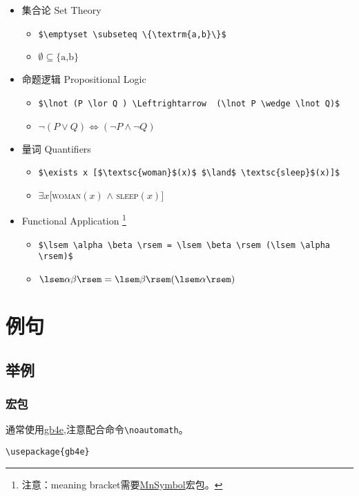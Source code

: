 \documentclass[a4paper,12pt]{article}
\begin{document}
\begin{itemize}
	\item 集合论 Set Theory
	\begin{itemize}
		\item \verb|$\emptyset \subseteq \{\textrm{a,b}\}$|
		\item $\emptyset \subseteq \{\textrm{a,b}\}$
	\end{itemize}
	\item 命题逻辑 Propositional Logic
	\begin{itemize}
		\item \verb|$\lnot (P \lor Q ) \Leftrightarrow	(\lnot P \wedge \lnot Q)$|
		\item $\lnot (P \lor Q ) \Leftrightarrow
		(\lnot P \wedge \lnot Q)$
	\end{itemize}
	\item 量词 Quantifiers
	\begin{itemize}
		\item \verb|$\exists x [$\textsc{woman}$(x)$ $\land$ \textsc{sleep}$(x)]$|
		\item $\exists x [$\textsc{woman}$(x)$ $\land$ \textsc{sleep}$(x)]$
	\end{itemize}
	\item Functional Application \footnote{注意：meaning bracket需要\href{https://www.ctan.org/pkg/mnsymbol}{MnSymbol}宏包。}
	\begin{itemize}
		\item \verb|$\lsem \alpha \beta \rsem = \lsem \beta \rsem (\lsem \alpha \rsem)$|
		\item $\lsem \alpha \beta \rsem = \lsem \beta \rsem (\lsem \alpha \rsem)$
	\end{itemize}
\end{itemize}


\section{例句}

\subsection{举例}
\subsubsection{宏包}

通常使用\href{https://www.ctan.org/pkg/gb4e}{gb4e},注意配合命令\verb|\noautomath|。

\verb|\usepackage{gb4e}|
\end{document}
